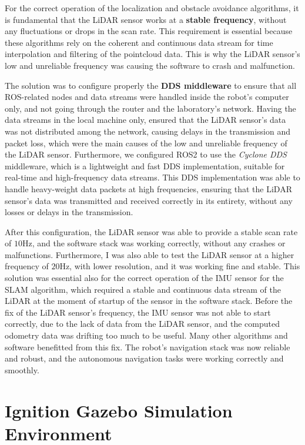 For the correct operation of the localization and obstacle 
avoidance algorithms, it is fundamental that the LiDAR sensor works at a \textbf{stable frequency}, 
without any fluctuations or drops in the scan rate. This requirement is essential because these algorithms rely on the
coherent and continuous data stream for time interpolation and filtering of the pointcloud data.
This is why the LiDAR sensor's low and unreliable frequency was causing the software to crash and malfunction.

The solution was to configure properly the \textbf{DDS middleware} to ensure that all ROS-related nodes and data streams
were handled inside the robot's computer only, and not going through the router and the laboratory's network.
Having the data streams in the local machine only, ensured that the LiDAR sensor's data was not distributed 
among the network, causing delays in the transmission and packet loss, which were the main causes of the low and unreliable
frequency of the LiDAR sensor. Furthermore, we configured ROS2 to use the \textit{Cyclone DDS} middleware, which is a lightweight
and fast DDS implementation, suitable for real-time and high-frequency data streams. This DDS implementation was able to handle
heavy-weight data packets at high frequencies, ensuring that the LiDAR sensor's data was transmitted and received correctly
in its entirety, without any losses or delays in the transmission.

After this configuration, the LiDAR sensor was able to provide a stable scan rate of $10$Hz,
and the software stack was working correctly, without any crashes or malfunctions.
Furthermore, I was also able to test the LiDAR sensor at a higher frequency of $20$Hz, 
with lower resolution, and it was working fine and stable.
This solution was essential also for the correct operation of the IMU sensor for the SLAM algorithm, which required
a stable and continuous data stream of the LiDAR at the moment of startup of the sensor in the software stack. Before the 
fix of the LiDAR sensor's frequency, the IMU sensor was not able to start correctly, due to the lack of data
from the LiDAR sensor, and the computed odometry data was drifting too much to be useful.
Many other algorithms and software benefitted from this fix. The robot's navigation stack was now reliable and robust,
and the autonomous navigation tasks were working correctly and smoothly.


\section{Ignition Gazebo Simulation Environment}

